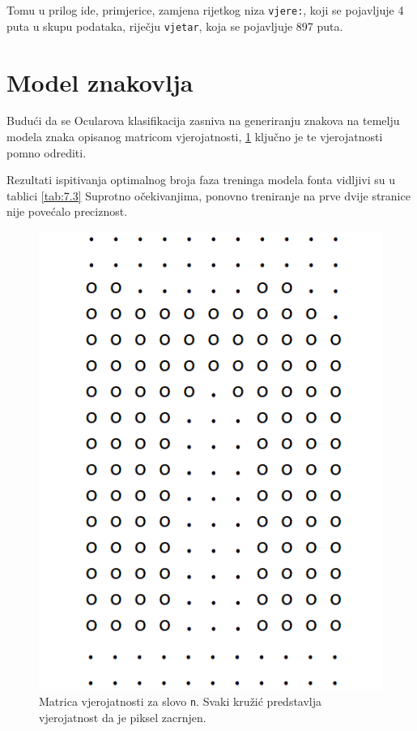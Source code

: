 \documentclass[zavrsnirad]{fer}
\begin{document}
Tomu u prilog ide, primjerice, zamjena rijetkog niza \texttt{vjere:}, koji se pojavljuje 4 puta u skupu podataka, riječju \texttt{vjetar}, koja se pojavljuje 897 puta. 

\section{Model znakovlja}

\begin{multicols}{2}
	
Budući da se Ocularova klasifikacija zasniva na generiranju znakova na temelju modela znaka opisanog matricom vjerojatnosti, \ref{slk:matrica} ključno je te vjerojatnosti pomno odrediti.

Rezultati ispitivanja optimalnog broja faza treninga modela fonta vidljivi su u tablici \ref{tab:7.3}  Suprotno očekivanjima, ponovno treniranje na prve dvije stranice nije povećalo preciznost.

	\columnbreak
	
\begin{figure}[H]
	\centering
	\includegraphics[width=0.6\linewidth]{Figures/letter-matrix.png} 
	\caption{Matrica vjerojatnosti za slovo \texttt{n}. Svaki kružić predstavlja vjerojatnost da je piksel zacrnjen.}
	\label{slk:matrica}
\end{figure}

\end{multicols}
\end{document}
